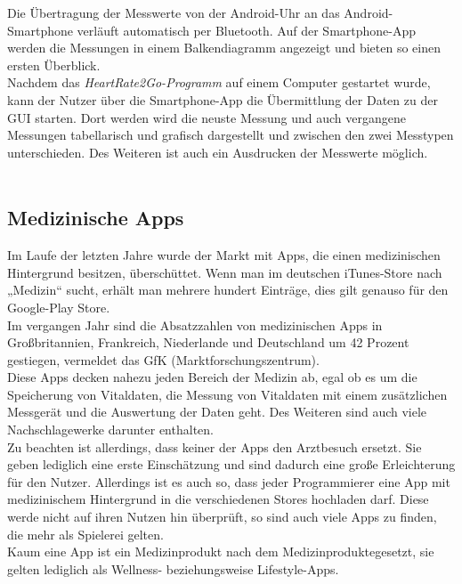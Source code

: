 Die Übertragung der Messwerte von der Android-Uhr an das Android-Smartphone verläuft automatisch per Bluetooth. Auf der Smartphone-App werden die Messungen in einem Balkendiagramm angezeigt und bieten so einen ersten Überblick. \\
Nachdem das \textit{HeartRate2Go-Programm} auf einem Computer gestartet wurde, kann der Nutzer über die Smartphone-App die Übermittlung der Daten zu der GUI starten. Dort werden wird die neuste Messung und auch vergangene Messungen tabellarisch und grafisch dargestellt und zwischen den zwei Messtypen unterschieden. Des Weiteren ist auch ein Ausdrucken der Messwerte möglich.\\
\\  
\subsection{Medizinische Apps}\label{sec:Medizinische Apps}
Im Laufe der letzten Jahre wurde der Markt mit Apps, die einen medizinischen Hintergrund besitzen, überschüttet. Wenn man im deutschen iTunes-Store nach „Medizin“ sucht, erhält man mehrere hundert Einträge, dies gilt genauso für den Google-Play Store. \\
Im vergangen Jahr sind die Absatzzahlen von medizinischen Apps in Großbritannien, Frankreich, Niederlande und Deutschland um 42 Prozent gestiegen, vermeldet das GfK (Marktforschungszentrum).\\
Diese Apps decken nahezu jeden Bereich der Medizin ab, egal ob es um die Speicherung von Vitaldaten, die Messung von Vitaldaten mit einem zusätzlichen Messgerät und die Auswertung der Daten geht. Des Weiteren sind auch viele Nachschlagewerke darunter enthalten.\\
Zu beachten ist allerdings, dass keiner der Apps den Arztbesuch ersetzt. Sie geben lediglich eine erste Einschätzung und sind dadurch eine große Erleichterung für den Nutzer. Allerdings ist es auch so, dass jeder Programmierer eine App mit medizinischem Hintergrund in die verschiedenen Stores hochladen darf. Diese werde nicht auf ihren Nutzen hin überprüft, so sind auch viele Apps zu finden, die mehr als Spielerei gelten.\\
Kaum eine App ist ein Medizinprodukt nach dem Medizinproduktegesetzt, sie gelten lediglich als Wellness- beziehungsweise Lifestyle-Apps. \\
\\

\textbf{} 

